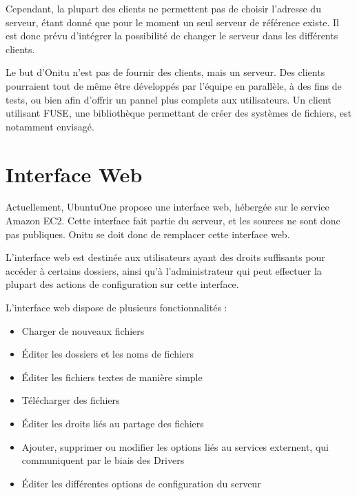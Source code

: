 Cependant, la plupart des clients ne permettent pas de choisir l'adresse du serveur, étant donné que pour le moment un seul serveur de référence existe. Il est donc prévu d'intégrer la possibilité de changer le serveur dans les différents clients.

Le but d'Onitu n'est pas de fournir des clients, mais un serveur. Des clients pourraient tout de même être développés par l'équipe en parallèle, à des fins de tests, ou bien afin d'offrir un pannel plus complets aux utilisateurs. Un client utilisant FUSE, une bibliothèque permettant de créer des systèmes de fichiers, est notamment envisagé.

\section{Interface Web}
Actuellement, UbuntuOne propose une interface web, hébergée sur le service Amazon EC2. Cette interface fait partie du serveur, et les sources ne sont donc pas publiques.
Onitu se doit donc de remplacer cette interface web.

L'interface web est destinée aux utilisateurs ayant des droits suffisants pour accéder à certains dossiers, ainsi qu'à l'administrateur qui peut effectuer la plupart des actions de configuration sur cette interface.

L'interface web dispose de plusieurs fonctionnalités :
\begin{itemize}
    \item Charger de nouveaux fichiers
    \item Éditer les dossiers et les noms de fichiers
    \item Éditer les fichiers textes de manière simple
    \item Télécharger des fichiers
    \item Éditer les droits liés au partage des fichiers
    \item Ajouter, supprimer ou modifier les options liés au services externent, qui communiquent par le biais des Drivers
    \item Éditer les différentes options de configuration du serveur
\end{itemize}